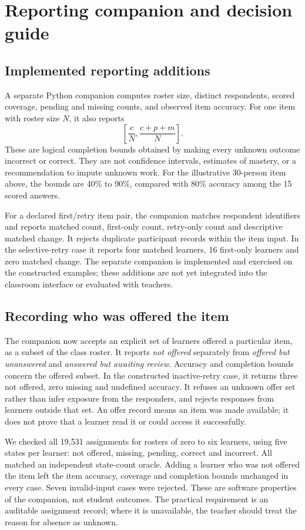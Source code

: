 \section{Reporting companion and decision guide}
\subsection{Implemented reporting additions}
A separate Python companion computes roster size, distinct respondents, scored coverage, pending and missing counts, and observed item accuracy. For one item with roster size $N$, it also reports
\[
 \left[\frac{c}{N},\frac{c+p+m}{N}\right].
\]
These are logical completion bounds obtained by making every unknown outcome incorrect or correct. They are not confidence intervals, estimates of mastery, or a recommendation to impute unknown work. For the illustrative 30-person item above, the bounds are 40\% to 90\%, compared with 80\% accuracy among the 15 scored answers.

For a declared first/retry item pair, the companion matches respondent identifiers and reports matched count, first-only count, retry-only count and descriptive matched change. It rejects duplicate participant records within the item input. In the selective-retry case it reports four matched learners, 16 first-only learners and zero matched change. The separate companion is implemented and exercised on the constructed examples; these additions are not yet integrated into the classroom interface or evaluated with teachers.

\subsection{Recording who was offered the item}
The companion now accepts an explicit set of learners offered a particular item, as a subset of the class roster. It reports \emph{not offered} separately from \emph{offered but unanswered} and \emph{answered but awaiting review}. Accuracy and completion bounds concern the offered subset. In the constructed inactive-retry case, it returns three not offered, zero missing and undefined accuracy. It refuses an unknown offer set rather than infer exposure from the responders, and rejects responses from learners outside that set. An offer record means an item was made available; it does not prove that a learner read it or could access it successfully.

We checked all 19,531 assignments for rosters of zero to six learners, using five states per learner: not offered, missing, pending, correct and incorrect. All matched an independent state-count oracle. Adding a learner who was not offered the item left the item accuracy, coverage and completion bounds unchanged in every case. Seven invalid-input cases were rejected. These are software properties of the companion, not student outcomes. The practical requirement is an auditable assignment record; where it is unavailable, the teacher should treat the reason for absence as unknown.

